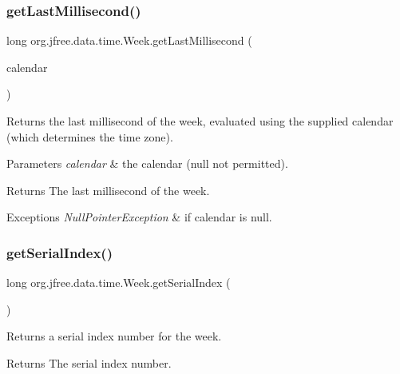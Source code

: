 \subsubsection{\texorpdfstring{get\+Last\+Millisecond()}{getLastMillisecond()}\hspace{0.1cm}{\footnotesize\ttfamily [2/2]}}
{\footnotesize\ttfamily long org.\+jfree.\+data.\+time.\+Week.\+get\+Last\+Millisecond (\begin{DoxyParamCaption}\item[{Calendar}]{calendar }\end{DoxyParamCaption})}

Returns the last millisecond of the week, evaluated using the supplied calendar (which determines the time zone).


\begin{DoxyParams}{Parameters}
{\em calendar} & the calendar ({\ttfamily null} not permitted).\\
\hline
\end{DoxyParams}
\begin{DoxyReturn}{Returns}
The last millisecond of the week.
\end{DoxyReturn}

\begin{DoxyExceptions}{Exceptions}
{\em Null\+Pointer\+Exception} & if {\ttfamily calendar} is {\ttfamily null}. \\
\hline
\end{DoxyExceptions}
\mbox{\label{classorg_1_1jfree_1_1data_1_1time_1_1_week_a6e3470783df9ec508c4948f53209559f}} 
\subsubsection{\texorpdfstring{get\+Serial\+Index()}{getSerialIndex()}}
{\footnotesize\ttfamily long org.\+jfree.\+data.\+time.\+Week.\+get\+Serial\+Index (\begin{DoxyParamCaption}{ }\end{DoxyParamCaption})}

Returns a serial index number for the week.

\begin{DoxyReturn}{Returns}
The serial index number. 
\end{DoxyReturn}
\mbox{\label{classorg_1_1jfree_1_1data_1_1time_1_1_week_a6d94c5958bfa4eee1daee417ec285195}} 
